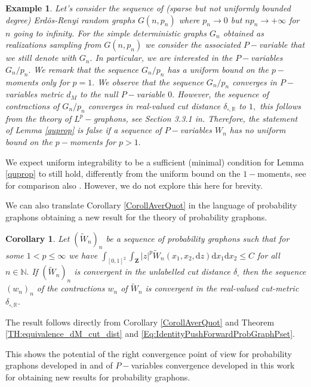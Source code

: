 \documentclass[11pt]{article}
\newtheorem{corollary}{Corollary}[theorem]
\newtheorem{example}[theorem]{Example}
\def\R{\mathbb{R}}
\def\N{\mathbb{N}}
\newcommand{\Space}{\mathbf{Z}}
\begin{document}
\begin{example}\label{CounterexamoUnifL1bound}
 Let's consider the sequence of (sparse but not uniformly bounded degree) Erd\"os-Renyi random graphs $G(n,p_n)$ where $p_n\rightarrow 0$ but $np_n \rightarrow +\infty$ for $n$ going to infinity. For the simple deterministic graphs $G_n$ obtained as realizations sampling from $G(n,p_n)$ we consider the associated $P-$variable that we still denote with $G_n.$ In particular, we are interested in the $P-$variables $G_n/p_n.$ We remark that the sequence $G_n/p_n$ has a uniform bound on the $p-$moments only for $p=1.$ We observe that the sequence $G_n/p_n$ converges in $P-$variables metric $d_M$ to the null $P-$variable $0.$ However, the sequence of contractions of $G_n/p_n$ converges in real-valued cut distance $\delta_{\square,\R}$ to $1,$ this follows from the theory of $L^p-$graphons, see Section 3.3.1 in\cite{Lpgraphon2}. Therefore, the statement of Lemma \ref{quprop} is false if a sequence of $P-$variables $W_n$ has no uniform bound on the $p-$moments for $p>1.$
\end{example}

We expect uniform integrability to be a sufficient (minimal) condition for Lemma \ref{quprop} to still hold, differently from the uniform bound on the $1-$moments, see for comparison also \cite{LpGraphons1,Lpgraphon2}. However, we do not explore this here for brevity.

We can also translate Corollary \ref{CorollAverQuot} in the language of probability graphons obtaining a new result for the theory of probability graphons.
\begin{corollary}
Let $(\widetilde W_n)_n$ be a sequence of probability graphons such that for some $1< p\leq \infty$ we have $\int_{[0,1]^2}\int_{\Space}|z|^p\widetilde W_n(x_1,x_2,\mathrm{d}z)\mathrm{d}x_1 \mathrm{d}x_2\leq C$ for all $n\in \N.$  If $(\widetilde W_n)_n$ is convergent in the unlabelled cut distance $\delta_{\square}$ then the sequence $(w_n)_n$ of the contractions $w_n$ of $\widetilde W_n$ is convergent in the real-valued cut-metric $\delta_{\square,\R}.$   
\end{corollary}
\proof
The result follows directly from Corollary \ref{CorollAverQuot} and Theorem \ref{TH:equivalence_dM_cut_dist} and \eqref{Eq:IdentityPushForwardProbGraphPset}.
\endproof

This shows the potential of the right convergence point of view for probability graphons developed in \cite{zucal2024probabilitygraphonsrightconvergence} and of $P-$variables convergence developed in this work for obtaining new results for probability graphons.
\end{document}
